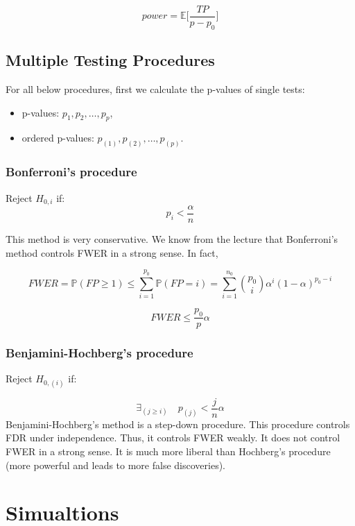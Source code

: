 \documentclass[
]{article}
\begin{document}
\[power = \mathbb{E}\Bigg[ \frac{TP}{p - p_0} \Bigg]\]

\hypertarget{multiple-testing-procedures}{%
\subsection{Multiple Testing
Procedures}\label{multiple-testing-procedures}}

For all below procedures, first we calculate the p-values of single
tests:

\begin{itemize}
\item
  p-values: \(p_1, p_2, \ldots, p_p\),
\item
  ordered p-values: \(p_{(1)}, p_{(2)}, \ldots, p_{(p)}\).
\end{itemize}

\hypertarget{bonferronis-procedure}{%
\subsubsection{Bonferroni's procedure}\label{bonferronis-procedure}}

Reject \(H_{0, i}\) if: \[p_i <  \frac \alpha n\]

This method is very conservative. We know from the lecture that
Bonferroni's method controls FWER in a strong sense. In fact,

\[FWER = \mathbb{P}(FP \geq 1) \leq \sum_{i=1}^{p_0}\mathbb P(FP = i) = \sum_{i=1}^{n_0} {{p_0}\choose{i}} \alpha^i(1 - \alpha)^{p_0 - i}\]

\[FWER \leq \frac{p_0}{p} \alpha\]

\hypertarget{benjamini-hochbergs-procedure}{%
\subsubsection{Benjamini-Hochberg's
procedure}\label{benjamini-hochbergs-procedure}}

Reject \(H_{0, (i)}\) if:

\[\exists _{(j \geq i)}  \quad p_{(j)} <  \frac {j} {n} \alpha\]
Benjamini-Hochberg's method is a step-down procedure. This procedure
controls FDR under independence. Thus, it controls FWER weakly. It does
not control FWER in a strong sense. It is much more liberal than
Hochberg's procedure (more powerful and leads to more false
discoveries).

\hypertarget{simualtions}{%
\section{Simualtions}\label{simualtions}}
\end{document}
